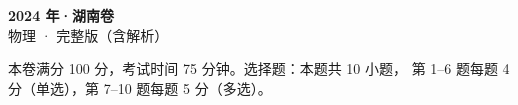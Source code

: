 \documentclass[zihao=-4, a4paper]{ctexart}
\begin{document}
\begin{center}
  {\Large\bfseries 2024 年·湖南卷}\\[4pt]
  {\large 物理 · 完整版（含解析）}
\end{center}
\medskip
\begin{gknotice}
  本卷满分 100 分，考试时间 75 分钟。选择题：本题共 10 小题，
  第 1--6 题每题 4 分（单选），第 7--10 题每题 5 分（多选）。
\end{gknotice}

\clearpage
{}

\clearpage
{}

\end{document}
